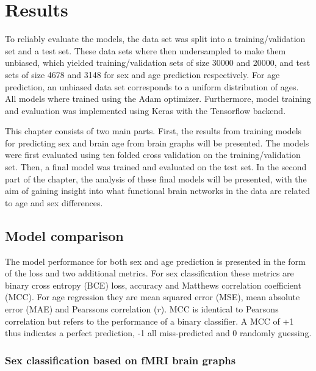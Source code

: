 \chapter{Results}


To reliably evaluate the models, the data set was split into a training/validation set and a test set. These data sets where then undersampled to make them unbiased, which yielded training/validation sets of size 30000 and 20000, and test sets of size  4678 and 3148 for sex and age prediction respectively. For age prediction, an unbiased data set corresponds to a uniform distribution of ages. All models where trained using the Adam optimizer. Furthermore, model training and evaluation was implemented using Keras with the Tensorflow backend. 

This chapter consists of two main parts. First, the results from training models for predicting sex and brain age from brain graphs will be presented. The models were first evaluated using ten folded cross validation on the training/validation set. Then, a final model was trained and evaluated on the test set. In the second part of the chapter, the analysis of these final models will be presented, with the aim of gaining insight into what functional brain networks in the data are related to age and sex differences. 


\section{Model comparison}
\label{sec:model_pred}
The model performance for both sex and age prediction is presented in the form of the loss and two additional metrics. For sex classification these metrics are binary cross entropy (BCE) loss, accuracy and Matthews correlation coefficient (MCC). For age regression they are mean squared error (MSE), mean absolute error (MAE) and Pearssons correlation ($r$). MCC is identical to Pearsons correlation but refers to the performance of a binary classifier. A MCC of +1 thus indicates a perfect prediction, -1 all miss-predicted and 0 randomly guessing.

\subsection{Sex classification based on fMRI brain graphs}

